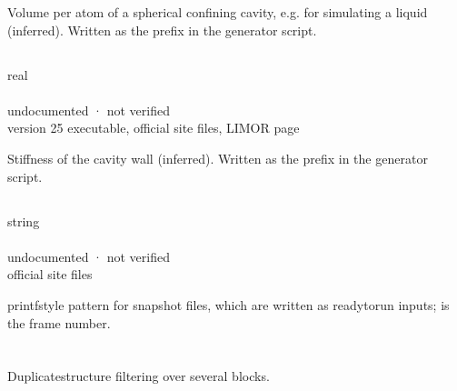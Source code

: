 \documentclass[letterpaper,10pt,english,openany,oneside]{sphinxmanual}
\begin{document}
\sphinxAtStartPar
Volume per atom of a spherical confining cavity, e.g. for simulating a liquid (inferred). Written as the prefix  in the generator script.


\subsection{}
\label{\detokenize{reference/dynamic:hb}}\label{\detokenize{reference/dynamic:dynamic-hb}}
\ignorespaces 
\sphinxAtStartPar
{} real\\
 \\
 undocumented · not verified\\
 version 25 executable, official site files, LIMOR page

\sphinxAtStartPar
Stiffness of the cavity wall (inferred). Written as the prefix  in the generator script.


\subsection{}
\label{\detokenize{reference/dynamic:file}}\label{\detokenize{reference/dynamic:dynamic-file}}
\ignorespaces 
\sphinxAtStartPar
{} string\\
 \\
 undocumented · not verified\\
 official site files

\sphinxAtStartPar
printf\sphinxhyphen{}style pattern for snapshot files, which are written as ready\sphinxhyphen{}to\sphinxhyphen{}run inputs;  is the frame number.

\sphinxstepscope




\section{}
\label{\detokenize{reference/uniq:uniq}}\label{\detokenize{reference/uniq:group-uniq}}\label{\detokenize{reference/uniq::doc}}
\ignorespaces 
\sphinxAtStartPar
Duplicate\sphinxhyphen{}structure filtering over several  blocks.
\end{document}
